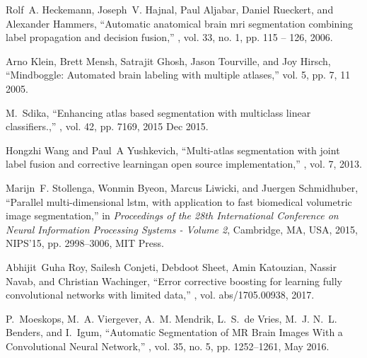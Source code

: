 \documentclass{article}
\begin{document}

\begin{thebibliography}{10}

Rolf~A. Heckemann, Joseph~V. Hajnal, Paul Aljabar, Daniel Rueckert, and
  Alexander Hammers,
\newblock ``Automatic anatomical brain mri segmentation combining label
  propagation and decision fusion,''
, vol. 33, no. 1, pp. 115 -- 126, 2006.

Arno Klein, Brett Mensh, Satrajit Ghosh, Jason Tourville, and Joy Hirsch,
\newblock ``Mindboggle: Automated brain labeling with multiple atlases,''
\newblock vol. 5, pp. 7, 11 2005.

M.~Sdika,
\newblock ``Enhancing atlas based segmentation with multiclass linear
  classifiers.,''
, vol. 42, pp. 7169, 2015 Dec 2015.

Hongzhi Wang and Paul~A Yushkevich,
\newblock ``Multi-atlas segmentation with joint label fusion and corrective
  learningan open source implementation,''
, vol. 7, 2013.

Marijn~F. Stollenga, Wonmin Byeon, Marcus Liwicki, and Juergen Schmidhuber,
\newblock ``Parallel multi-dimensional lstm, with application to fast
  biomedical volumetric image segmentation,''
\newblock in {\em Proceedings of the 28th International Conference on Neural
  Information Processing Systems - Volume 2}, Cambridge, MA, USA, 2015,
  NIPS'15, pp. 2998--3006, MIT Press.

Abhijit~Guha Roy, Sailesh Conjeti, Debdoot Sheet, Amin Katouzian, Nassir Navab,
  and Christian Wachinger,
\newblock ``Error corrective boosting for learning fully convolutional networks
  with limited data,''
, vol. abs/1705.00938, 2017.

P.~Moeskops, M.~A. Viergever, A.~M. Mendrik, L.~S.~de Vries, M.~J. N.~L.
  Benders, and I.~Igum,
\newblock ``Automatic {Segmentation} of {MR} {Brain} {Images} {With} a
  {Convolutional} {Neural} {Network},''
, vol. 35, no. 5, pp.
  1252--1261, May 2016.


\end{thebibliography}
\end{document}
